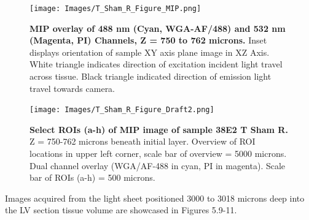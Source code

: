 \begin{figure}[H]
    \centering
        \texttt{[image: Images/T\_Sham\_R\_Figure\_MIP.png]}
        \caption{\textbf{MIP overlay of 488 nm (Cyan, WGA-AF/488) and 532 nm (Magenta, PI) Channels, Z = 750 to 762 microns.} Inset displays orientation of sample XY axis plane image in XZ Axis. White triangle indicates direction of excitation incident light travel across tissue. Black triangle indicated direction of emission light travel towards camera.}
        \label{fig:enter-label}
\end{figure}



\begin{figure}[H]
\texttt{[image: Images/T\_Sham\_R\_Figure\_Draft2.png]}
\caption{\textbf{Select ROIs (a-h) of MIP image of sample 38E2 T Sham R.} Z = 750-762 microns beneath initial layer. Overview of ROI locations in upper left corner, scale bar of overview = 5000 microns. Dual channel overlay (WGA/AF-488 in cyan, PI in magenta). Scale bar of ROIs (a-h) = 500 microns.}
\label{fig:enter-label}
\end{figure}

Images acquired from the light sheet positioned 3000 to 3018 microns deep into the LV section tissue volume are showcased in Figures 5.9-11. 

